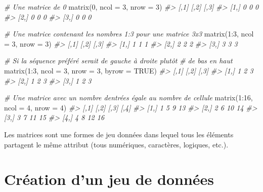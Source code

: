 \documentclass[
]{book}
\newenvironment{Shaded}{}{}
\newcommand{\AttributeTok}[1]{#1}
\newcommand{\CommentTok}[1]{\textit{#1}}
\newcommand{\ConstantTok}[1]{#1}
\newcommand{\DecValTok}[1]{#1}
\newcommand{\FunctionTok}[1]{#1}
\newcommand{\NormalTok}[1]{#1}
\newcommand{\SpecialCharTok}[1]{#1}
\begin{document}
\begin{Shaded}
\begin{Highlighting}[]
\CommentTok{\# Une matrice de 0}
\FunctionTok{matrix}\NormalTok{(}\DecValTok{0}\NormalTok{, }\AttributeTok{ncol =} \DecValTok{3}\NormalTok{, }\AttributeTok{nrow =} \DecValTok{3}\NormalTok{)}
\CommentTok{\#\textgreater{}      [,1] [,2] [,3]}
\CommentTok{\#\textgreater{} [1,]    0    0    0}
\CommentTok{\#\textgreater{} [2,]    0    0    0}
\CommentTok{\#\textgreater{} [3,]    0    0    0}

\CommentTok{\# Une matrice contenant les nombres 1:3 pour une matrice 3x3}
\FunctionTok{matrix}\NormalTok{(}\DecValTok{1}\SpecialCharTok{:}\DecValTok{3}\NormalTok{, }\AttributeTok{ncol =} \DecValTok{3}\NormalTok{, }\AttributeTok{nrow =} \DecValTok{3}\NormalTok{)}
\CommentTok{\#\textgreater{}      [,1] [,2] [,3]}
\CommentTok{\#\textgreater{} [1,]    1    1    1}
\CommentTok{\#\textgreater{} [2,]    2    2    2}
\CommentTok{\#\textgreater{} [3,]    3    3    3}

\CommentTok{\# Si la séquence préféré serait de gauche à droite plutôt}
\CommentTok{\# de bas en haut}
\FunctionTok{matrix}\NormalTok{(}\DecValTok{1}\SpecialCharTok{:}\DecValTok{3}\NormalTok{, }\AttributeTok{ncol =} \DecValTok{3}\NormalTok{, }\AttributeTok{nrow =} \DecValTok{3}\NormalTok{, }\AttributeTok{byrow =} \ConstantTok{TRUE}\NormalTok{)}
\CommentTok{\#\textgreater{}      [,1] [,2] [,3]}
\CommentTok{\#\textgreater{} [1,]    1    2    3}
\CommentTok{\#\textgreater{} [2,]    1    2    3}
\CommentTok{\#\textgreater{} [3,]    1    2    3}

\CommentTok{\# Une matrice avec un nombre d\textquotesingle{}entrées égale au nombre de cellule}
\FunctionTok{matrix}\NormalTok{(}\DecValTok{1}\SpecialCharTok{:}\DecValTok{16}\NormalTok{, }\AttributeTok{ncol =} \DecValTok{4}\NormalTok{, }\AttributeTok{nrow =} \DecValTok{4}\NormalTok{)}
\CommentTok{\#\textgreater{}      [,1] [,2] [,3] [,4]}
\CommentTok{\#\textgreater{} [1,]    1    5    9   13}
\CommentTok{\#\textgreater{} [2,]    2    6   10   14}
\CommentTok{\#\textgreater{} [3,]    3    7   11   15}
\CommentTok{\#\textgreater{} [4,]    4    8   12   16}
\end{Highlighting}
\end{Shaded}

Les matrices sont une formes de jeu données dans lequel tous les éléments partagent le même attribut (tous numériques, caractères, logiques, etc.).

\hypertarget{cruxe9ation-dun-jeu-de-donnuxe9es}{%
\section{Création d'un jeu de données}\label{cruxe9ation-dun-jeu-de-donnuxe9es}}
\end{document}
